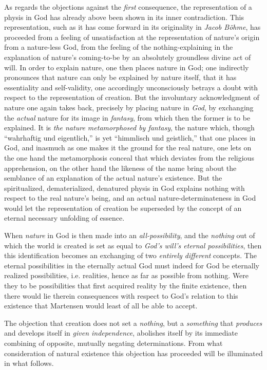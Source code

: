 \documentclass[12pt,a4paper]{book}
\begin{document}
As regards the objections against the \emph{first} consequence, the representation of a physis
in God has already above been shown in its inner contradiction. This representation, such
as it has come forward in its originality in \emph{Jacob Böhme}, has proceeded from a feeling of
unsatisfaction at the representation of nature's origin from a nature-less God, from the
feeling of the nothing-explaining in the explanation of nature's coming-to-be by an
absolutely groundless divine act of will. In order to explain nature, one then places
nature in God; one indirectly pronounces that nature can only be explained by nature
itself, that it has essentiality and self-validity, one accordingly unconsciously betrays
a doubt with respect to the representation of creation. But the involuntary acknowledgment
of nature one again takes back, precisely by placing nature in \emph{God}, by exchanging the
\emph{actual} nature for its image in \emph{fantasy}, from which then the former is to be explained. It
is \emph{the nature metamorphosed by fantasy}, the nature which, though ``wahrhaftig und
eigentlich,'' is yet ``himmlisch und geistlich,'' that one places in God, and inasmuch as
one makes it the ground for the real nature, one lets on the one hand the metamorphosis
conceal that which deviates from the religious apprehension, on the other hand the
likeness of the name bring about the semblance of an explanation of the actual nature's
existence. But the spiritualized, dematerialized, denatured physis in God explains nothing
with respect to the real nature's being, and an actual nature-determinateness in God would
let the representation of creation be superseded by the concept of an eternal necessary
unfolding of essence.

When \emph{nature} in God is then made into an \emph{all-possibility}, and the \emph{nothing} out of which the
world is created is set as equal to \emph{God's will's eternal possibilities}, then this
identification becomes an exchanging of two \emph{entirely different} concepts. The eternal
possibilities in the eternally actual God must indeed for God be eternally realized
possibilities, i.e. realities, hence as far as possible from nothing. Were they to be
possibilities that first acquired reality by the finite existence, then there would lie
therein consequences with respect to God's relation to this existence that Martensen would
least of all be able to accept.

The objection that creation does not set a \emph{nothing}, but a \emph{something} that
\emph{produces} and develops itself in \emph{given independence}, abolishes itself by its
immediate combining of opposite, mutually negating determinations. From what consideration
of natural existence this objection has proceeded will be illuminated in what follows.
\end{document}
